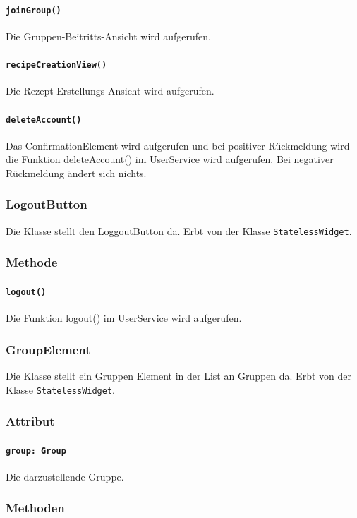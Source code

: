 \documentclass[parskip=full]{scrartcl}
\begin{document}
            \paragraph*{\texttt{joinGroup()}} Die Gruppen-Beitritts-Ansicht wird aufgerufen.
            \paragraph*{\texttt{recipeCreationView()}} Die Rezept-Erstellungs-Ansicht wird aufgerufen.
            \paragraph*{\texttt{deleteAccount()}} Das ConfirmationElement wird aufgerufen und bei positiver Rückmeldung wird die Funktion deleteAccount() im UserService wird aufgerufen. Bei negativer Rückmeldung ändert sich nichts. 
    
    \subsubsection{LogoutButton}
    Die Klasse stellt den LoggoutButton da. Erbt von der Klasse \texttt{StatelessWidget}.
        \subsubsection*{Methode}
            \paragraph*{\texttt{logout()}} Die Funktion logout() im UserService wird aufgerufen.
            
    \subsubsection*{GroupElement}
    Die Klasse stellt ein Gruppen Element in der List an Gruppen da. Erbt von der Klasse \texttt{StatelessWidget}.
        \subsubsection*{Attribut}
            \paragraph*{\texttt{group: Group}} Die darzustellende Gruppe.

        \subsubsection*{Methoden}
\end{document}
